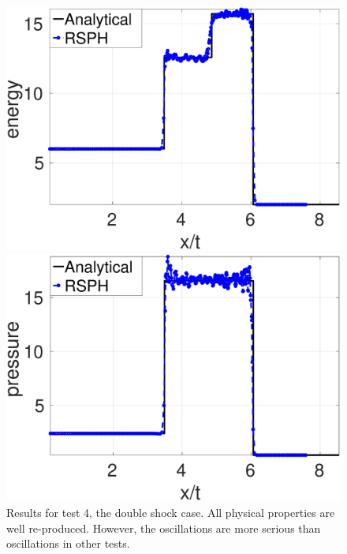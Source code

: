 \begin{figure}[H]
\begin{minipage}{.495\textwidth}
        \includegraphics[width=0.99 \textwidth]{Chapter-4/Figures/double_shock/Dshock-RCM-e-Rp6}
    \end{minipage}%
    \begin{minipage}{.495 \textwidth}
        \centering
        \includegraphics[width=0.99 \textwidth]{Chapter-4/Figures/double_shock/Dshock-RCM-p-Rp6}
    \end{minipage}%
    \caption{Results for test 4, the double shock case. All physical properties are well re-produced. However, the oscillations are more serious than oscillations in other tests.}
    \label{fig:RCM-double-shock}
\end{figure}

